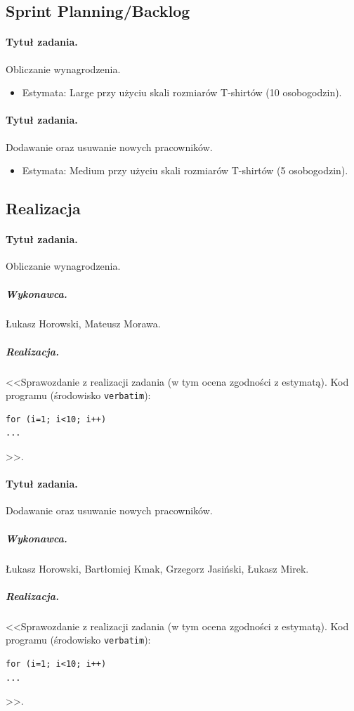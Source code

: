\documentclass[a4paper]{article}
\begin{document}
\subsection{Sprint Planning/Backlog}

\paragraph{Tytuł zadania.} Obliczanie wynagrodzenia.
\begin{itemize}
\item Estymata: Large przy użyciu skali rozmiarów T-shirtów (10 osobogodzin).
\end{itemize}

\paragraph{Tytuł zadania.} Dodawanie oraz usuwanie nowych pracowników.
\begin{itemize}
\item Estymata: Medium przy użyciu skali rozmiarów T-shirtów (5 osobogodzin).
\end{itemize}

\subsection{Realizacja}

\paragraph{Tytuł zadania.} Obliczanie wynagrodzenia.
\subparagraph{Wykonawca.} Łukasz Horowski, Mateusz Morawa.
\subparagraph{Realizacja.} <<Sprawozdanie z realizacji zadania (w tym ocena zgodności z estymatą). Kod programu (środowisko \texttt{verbatim}): \begin{verbatim}
for (i=1; i<10; i++)
...
\end{verbatim}>>.

\paragraph{Tytuł zadania.} Dodawanie oraz usuwanie nowych pracowników.
\subparagraph{Wykonawca.} Łukasz Horowski, Bartłomiej Kmak, Grzegorz Jasiński, Łukasz Mirek.
\subparagraph{Realizacja.} <<Sprawozdanie z realizacji zadania (w tym ocena zgodności z estymatą). Kod programu (środowisko \texttt{verbatim}): \begin{verbatim}
for (i=1; i<10; i++)
...
\end{verbatim}>>.
\end{document}
